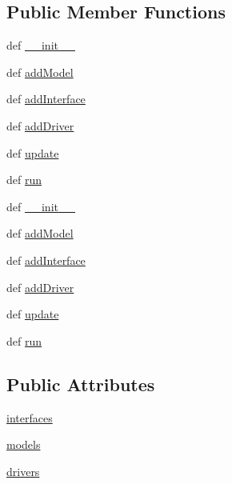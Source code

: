 \subsection*{Public Member Functions}
\begin{DoxyCompactItemize}
\item 
def \hyperlink{classinterface_1_1INTERFACE__CORE_1_1interface_a96fbbdd17999b9eb5430336f475c91ad}{\+\_\+\+\_\+init\+\_\+\+\_\+}
\item 
def \hyperlink{classinterface_1_1INTERFACE__CORE_1_1interface_a9e590fb5bf7673a7c77027f4ded29abb}{add\+Model}
\item 
def \hyperlink{classinterface_1_1INTERFACE__CORE_1_1interface_a7876b4f6147630ed64bde3864aed78c0}{add\+Interface}
\item 
def \hyperlink{classinterface_1_1INTERFACE__CORE_1_1interface_a54871907738176848a480584557cb65b}{add\+Driver}
\item 
def \hyperlink{classinterface_1_1INTERFACE__CORE_1_1interface_afca54b5f57d67ed5ba8b4dc110fa2647}{update}
\item 
def \hyperlink{classinterface_1_1INTERFACE__CORE_1_1interface_a2ba0b1d20f8ee0bf50b468bb82e91d4d}{run}
\item 
def \hyperlink{classinterface_1_1INTERFACE__CORE_1_1interface_a96fbbdd17999b9eb5430336f475c91ad}{\+\_\+\+\_\+init\+\_\+\+\_\+}
\item 
def \hyperlink{classinterface_1_1INTERFACE__CORE_1_1interface_a9e590fb5bf7673a7c77027f4ded29abb}{add\+Model}
\item 
def \hyperlink{classinterface_1_1INTERFACE__CORE_1_1interface_a7876b4f6147630ed64bde3864aed78c0}{add\+Interface}
\item 
def \hyperlink{classinterface_1_1INTERFACE__CORE_1_1interface_a54871907738176848a480584557cb65b}{add\+Driver}
\item 
def \hyperlink{classinterface_1_1INTERFACE__CORE_1_1interface_afca54b5f57d67ed5ba8b4dc110fa2647}{update}
\item 
def \hyperlink{classinterface_1_1INTERFACE__CORE_1_1interface_a2ba0b1d20f8ee0bf50b468bb82e91d4d}{run}
\end{DoxyCompactItemize}
\subsection*{Public Attributes}
\begin{DoxyCompactItemize}
\item 
\hyperlink{classinterface_1_1INTERFACE__CORE_1_1interface_a360e2dd2c4bc4c873884831bfaa86582}{interfaces}
\item 
\hyperlink{classinterface_1_1INTERFACE__CORE_1_1interface_a15823225e3f265a09e00938b28ac12da}{models}
\item 
\hyperlink{classinterface_1_1INTERFACE__CORE_1_1interface_accf9df0d1460957144aa70522fa66a6c}{drivers}
\end{DoxyCompactItemize}


